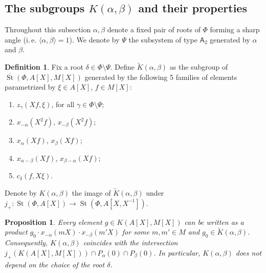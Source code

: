 \documentclass[oneside, 8pt]{amsart}
\newtheorem{prop}[lemma]{Proposition}
\theoremstyle{remark}
\theoremstyle{definition}
\numberwithin{lemma}{section}
\numberwithin{prop}{section}
\numberwithin{corollary}{section}
\numberwithin{externaltheorem}{section}
\newtheorem{df}[lemma]{Definition} \Crefname{df}{Definition}{Definitions}
\DeclareMathOperator{\St}{St}
\newcommand{\inv}{^{-1}}
\newcommand{\rA}{\mathsf{A}}
\numberwithin{equation}{section}
\begin{document}
\subsection{The subgroups \texorpdfstring{$K(\alpha, \beta)$}{K(a,b)} and their properties} \label{sec:Pa0-Steinberg}
Throughout this subsection $\alpha, \beta$ denote a fixed pair of roots of $\Phi$ forming a sharp angle (i.\,e. $\langle \alpha, \beta \rangle = 1$). We denote by $\Psi$ the subsystem of type $\rA_2$ generated by $\alpha$ and $\beta$.
\begin{df}\label{def:Kab} 
Fix a root $\delta \in \Phi \setminus \Psi$. Define $\widetilde{K}(\alpha, \beta)$ as the subgroup of $\overline{\St}(\Phi, A[X], M[X])$ generated by the following 5 families of elements parametrized by $\xi \in A[X]$, $f\in M[X]$:
 \begin{enumerate}
  \item $z_\gamma(Xf, \xi)$, for all $\gamma \in \Phi \setminus \Psi$;
  \item $x_{-\alpha}(X^2f)$, $x_{-\beta}(X^2f)$;
  \item $x_{\alpha}(Xf)$, $x_\beta(Xf)$;
  \item $x_{\alpha-\beta}(Xf)$, $x_{\beta-\alpha}(Xf)$;
  \item $c_{\delta}(f, X\xi)$. \end{enumerate}
Denote by $K(\alpha, \beta)$ the image of $\widetilde{K}(\alpha, \beta)$ under $j_+ \colon \St(\Phi, A[X]) \to \St(\Phi, A[X, X\inv])$. \end{df}
\begin{prop} \label{K-a-b} Every element $g \in K(A[X], M[X])$ can be written as a product $g_0 \cdot x_{-\alpha}(mX) \cdot x_{-\beta}(m'X)$ for some $m, m' \in M$ and $g_0 \in \widetilde{K}(\alpha, \beta)$. 
Consequently, $K(\alpha, \beta)$ coincides with the intersection $j_+(K(A[X], M[X])) \cap P_\alpha(0) \cap P_\beta(0)$. In particular, $K(\alpha, \beta)$ does not depend on the choice of the root $\delta$. \end{prop}
\end{document}
